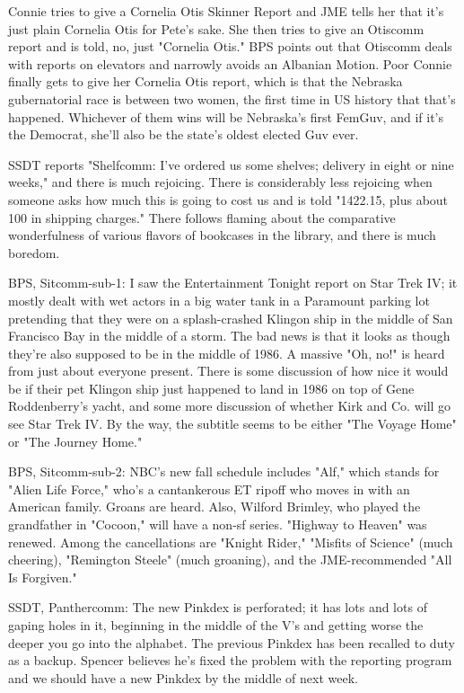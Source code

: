 \documentclass[12pt]{article}
\begin{document}
Connie tries to give a Cornelia Otis Skinner Report and JME tells her that it's just plain Cornelia Otis for Pete's sake. She then tries to give an Otiscomm report and is told, no, just "Cornelia Otis." BPS points out that Otiscomm deals with reports on elevators and narrowly avoids an Albanian Motion. Poor Connie finally gets to give her Cornelia Otis report, which is that the Nebraska gubernatorial race is between two women, the first time in US history that that's happened. Whichever of them wins will be Nebraska's first FemGuv, and if it's the Democrat, she'll also be the state's oldest elected Guv ever.

SSDT reports "Shelfcomm: I've ordered us some shelves; delivery in eight or nine weeks," and there is much rejoicing. There is considerably less rejoicing when someone asks how much this is going to cost us and is told "1422.15, plus about 100 in shipping charges." There follows flaming about the comparative wonderfulness of various flavors of bookcases in the library, and there is much boredom.

BPS, Sitcomm-sub-1: I saw the Entertainment Tonight report on Star Trek IV; it mostly dealt with wet actors in a big water tank in a Paramount parking lot pretending that they were on a splash-crashed Klingon ship in the middle of San Francisco Bay in the middle of a storm. The bad news is that it looks as though they're also supposed to be in the middle of 1986. A massive "Oh, no!" is heard from just about everyone present. There is some discussion of how nice it would be if their pet Klingon ship just happened to land in 1986 on top of Gene Roddenberry's yacht, and some more discussion of whether Kirk and Co. will go see Star Trek IV. By the way, the subtitle seems to be either "The Voyage Home" or "The Journey Home."

BPS, Sitcomm-sub-2: NBC's new fall schedule includes "Alf," which stands for "Alien Life Force," who's a cantankerous ET ripoff who moves in with an American family. Groans are heard. Also, Wilford Brimley, who played the grandfather in "Cocoon," will have a non-sf series. "Highway to Heaven" was renewed. Among the cancellations are "Knight Rider," "Misfits of Science" (much cheering), "Remington Steele" (much groaning), and the JME-recommended "All Is Forgiven."

SSDT, Panthercomm: The new Pinkdex is perforated; it has lots and lots of gaping holes in it, beginning in the middle of the V's and getting worse the deeper you go into the alphabet. The previous Pinkdex has been recalled to duty as a backup. Spencer believes he's fixed the problem with the reporting program and we should have a new Pinkdex by the middle of next week.
\end{document}
